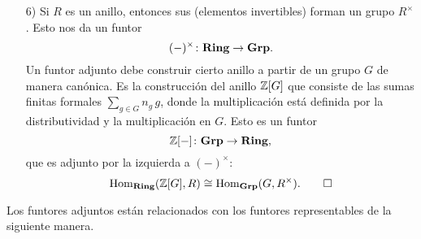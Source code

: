 \documentclass{article}
\numberwithin{equation}{section}
\theoremstyle{definition}
\begin{document}
\begin{ejemplo}
\begin{enumerate}
\item[6)] Si $R$ es un anillo, entonces sus  (elementos
  invertibles) forman un grupo $R^\times$. Esto nos da un funtor
  $$(-)^\times\colon \text{\bf Ring} \to \text{\bf Grp}.$$
  Un funtor adjunto debe construir cierto anillo a partir de un grupo $G$ de
  manera canónica. Es la construcción del anillo $\mathbb{Z} [G]$ que consiste de las
  sumas finitas formales $\sum_{g\in G} n_g \, g$, donde la multiplicación está
  definida por la distributividad y la multiplicación en $G$. Esto es un funtor
  $$\mathbb{Z} [-]\colon \text{\bf Grp} \to \text{\bf Ring},$$
  que es adjunto por la izquierda a $(-)^\times$:
  \[ \operatorname{Hom}_{\text{\bf Ring}} (\mathbb{Z} [G], R) \cong
     \operatorname{Hom}_{\text{\bf Grp}} (G, R^\times). \qedhere \]
  \end{enumerate}
\end{ejemplo}

Los funtores adjuntos están relacionados con los funtores representables de la
siguiente manera.
\end{document}
